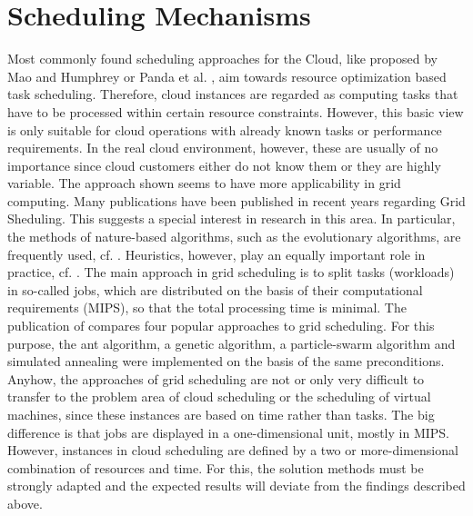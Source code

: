 \section{Scheduling Mechanisms}
Most commonly found scheduling approaches for the Cloud, like proposed by Mao and Humphrey \cite{6114435} or Panda et al. \cite{PANDA2015176}, aim towards resource optimization based task scheduling. Therefore, cloud instances are regarded as computing tasks that have to be processed within certain resource constraints. However, this basic view is only suitable for cloud operations with already known tasks or performance requirements. In the real cloud environment, however, these are usually of no importance since cloud customers either do not know them or they are highly variable. The approach shown seems to have more applicability in grid computing. Many publications have been published in recent years regarding Grid Sheduling. This suggests a special interest in research in this area. In particular, the methods of nature-based algorithms, such as the evolutionary algorithms, are frequently used, cf. \cite{tlda} \cite{Ga-grid-2}. Heuristics, however, play an equally important role in practice, cf. \cite{riskheuristik}. The main approach in grid scheduling is to split tasks (workloads) in so-called jobs, which are distributed on the basis of their computational requirements (MIPS), so that the total processing time is minimal. The publication of \cite{4heurisitken} compares four popular approaches to grid scheduling. For this purpose, the ant algorithm, a genetic algorithm, a particle-swarm algorithm and simulated annealing were implemented on the basis of the same preconditions. Anyhow, the approaches of grid scheduling are not or only very difficult to transfer to the problem area of cloud scheduling or the scheduling of virtual machines, since these instances are based on time rather than tasks. The big difference is that jobs are displayed in a one-dimensional unit, mostly in MIPS. However, instances in cloud scheduling are defined by a two or more-dimensional combination of resources and time. For this, the solution methods must be strongly adapted and the expected results will deviate from the findings described above.

